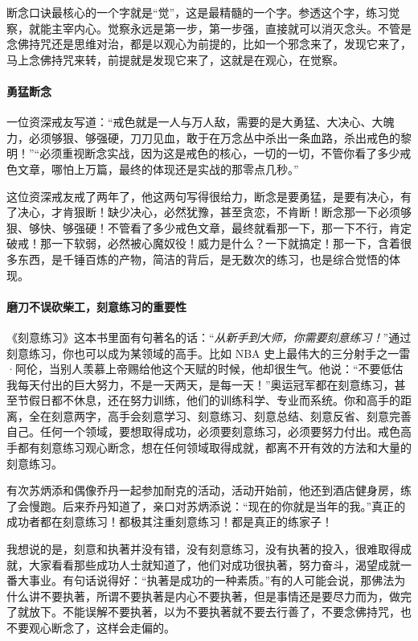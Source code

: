 断念口诀最核心的一个字就是“觉”，这是最精髓的一个字。参透这个字，练习觉察，就能主宰内心。觉察永远是第一步，第一步强，直接就可以消灭念头。不管是念佛持咒还是思维对治，都是以观心为前提的，比如一个邪念来了，发现它来了，马上念佛持咒来转，前提就是发现它来了，这就是在观心，在觉察。

\paragraph{勇猛断念}

一位资深戒友写道：“戒色就是一人与万人敌，需要的是大勇猛、大决心、大魄力，必须够狠、够强硬，刀刀见血，敢于在万念丛中杀出一条血路，杀出戒色的黎明！”“必须重视断念实战，因为这是戒色的核心，一切的一切，不管你看了多少戒色文章，哪怕上万篇，最终的体现还是实战的那零点几秒。”

这位资深戒友戒了两年了，他这两句写得很给力，断念是要勇猛，是要有决心，有了决心，才肯狠断！缺少决心，必然犹豫，甚至贪恋，不肯断！断念那一下必须够狠、够快、够强硬！不管看了多少戒色文章，最终就看那一下，那一下不行，肯定破戒！那一下软弱，必然被心魔奴役！威力是什么？一下就搞定！那一下，含着很多东西，是千锤百炼的产物，简洁的背后，是无数次的练习，也是综合觉悟的体现。

\paragraph{磨刀不误砍柴工，刻意练习的重要性}

《刻意练习》这本书里面有句著名的话：“\textit{从新手到大师，你需要刻意练习！}”通过刻意练习，你也可以成为某领域的高手。比如 NBA 史上最伟大的三分射手之一雷·阿伦，当别人羡慕上帝赐给他这个天赋的时候，他却很生气。他说：“不要低估我每天付出的巨大努力，不是一天两天，是每一天！”奥运冠军都在刻意练习，甚至节假日都不休息，还在努力训练，他们的训练科学、专业而系统。你和高手的距离，全在刻意两字，高手会刻意学习、刻意练习、刻意总结、刻意反省、刻意完善自己。任何一个领域，要想取得成功，必须要刻意练习，必须要努力付出。戒色高手都有刻意练习观心断念，想在任何领域取得成就，都离不开有效的方法和大量的刻意练习。

有次苏炳添和偶像乔丹一起参加耐克的活动，活动开始前，他还到酒店健身房，练了会慢跑。后来乔丹知道了，亲口对苏炳添说：“现在的你就是当年的我。”真正的成功者都在刻意练习！都极其注重刻意练习！都是真正的练家子！

我想说的是，刻意和执著并没有错，没有刻意练习，没有执著的投入，很难取得成就，大家看看那些成功人士就知道了，他们对成功很执著，努力奋斗，渴望成就一番大事业。有句话说得好：“执著是成功的一种素质。”有的人可能会说，那佛法为什么讲不要执著，所谓不要执著是内心不要执著，但是事情还是要尽力而为，做完了就放下。不能误解不要执著，以为不要执著就不要去行善了，不要念佛持咒，也不要观心断念了，这样会走偏的。

